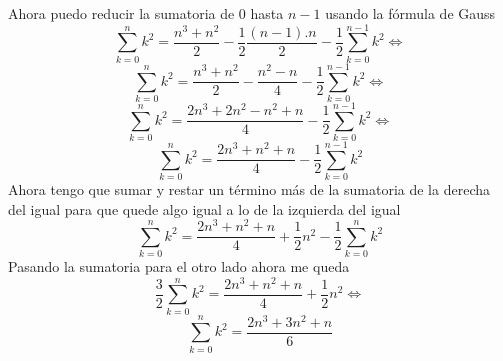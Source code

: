 \documentclass[a4paper,10pt]{article}
\begin{document}
Ahora puedo reducir la sumatoria de $0$ hasta $n-1$ usando la f\'ormula de
Gauss
\begin{displaymath}
\sum_{k=0}^{n} k^2 = \frac{n^3 + n^2}{2} -
\frac{1}{2} \frac{(n-1).n}{2} -
\frac{1}{2} \sum_{k=0}^{n-1} k^2 \Longleftrightarrow
\end{displaymath}
\begin{displaymath}
\sum_{k=0}^{n} k^2 = \frac{n^3 + n^2}{2} -
\frac{n^2 - n}{4} -
\frac{1}{2} \sum_{k=0}^{n-1} k^2 \Longleftrightarrow
\end{displaymath}
\begin{displaymath}
\sum_{k=0}^{n} k^2 = \frac{2n^3 + 2n^2 - n^2 + n}{4} -
\frac{1}{2} \sum_{k=0}^{n-1} k^2 \Longleftrightarrow
\end{displaymath}
\begin{displaymath}
\sum_{k=0}^{n} k^2 = \frac{2n^3 + n^2 + n}{4} -
\frac{1}{2} \sum_{k=0}^{n-1} k^2
\end{displaymath}
Ahora tengo que sumar y restar un t\'ermino m\'as de la sumatoria de la
derecha del igual para que quede algo igual a lo de la izquierda del igual
\begin{displaymath}
\sum_{k=0}^{n} k^2 = \frac{2n^3 + n^2 + n}{4} +
\frac{1}{2} n^2 - \frac{1}{2} \sum_{k=0}^{n} k^2
\end{displaymath}
Pasando la sumatoria para el otro lado ahora me queda
\begin{displaymath}
\frac{3}{2} \sum_{k=0}^{n} k^2 = \frac{2n^3 + n^2 + n}{4} +
\frac{1}{2} n^2 \Longleftrightarrow
\end{displaymath}
\begin{equation}
\sum_{k=0}^{n} k^2 = \frac{2n^3 + 3n^2 + n}{6}
\end{equation}
\end{document}
